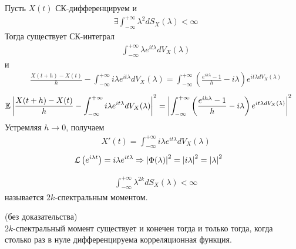\begin{example}
    Пусть $X(t)$ СК-дифференцируем и
    \begin{align*}
      & \exists \int_{-\infty}^{+\infty}\lambda^2dS_X(\lambda)< \infty
    \end{align*}
    Тогда существует СК-интеграл
    \begin{align*}
      & \int_{-\infty}^{+\infty}\lambda e^{it\lambda} dV_X(\lambda)
    \end{align*}
    и
    \begin{align*}
      & \frac{X(t+h) - X(t)}{h} - \int_{-\infty}^{+\infty}i\lambda e^{it\lambda} dV_X(\lambda) = \int_{-\infty}^{+\infty}\left( \frac{e^{ih\lambda}-1}{h}-i\lambda \right)e^{it\lambda dV_X(\lambda)}
    \end{align*}
     \begin{align*}
      & \mathbb{E}\left| \frac{X(t+h) - X(t)}{h} - \int_{-\infty}^{+\infty}i\lambda e^{it\lambda} dV_X(\lambda) \right|^2 = \left| \int_{-\infty}^{+\infty}\left( \frac{e^{ih\lambda}-1}{h}-i\lambda \right)e^{it\lambda dV_X(\lambda)} \right|^2
     \end{align*}
     Устремляя $h \to 0$, получаем
     \begin{align*}
      & X'(t) = \int_{-\infty}^{+\infty}i\lambda e^{it\lambda} dV_X(\lambda)
     \end{align*}
     \begin{align*}
       & \mathcal{L}\left( e^{i\lambda t} \right) = i\lambda e^{it\lambda} \Rightarrow \left| \Phi(\lambda) \right|^2 = \left| i\lambda \right|^2 = \left| \lambda \right|^2
    \end{align*}
\end{example}
\begin{Def}
    \begin{align*}
      & \int_{-\infty}^{+\infty}\lambda^{2k}dS_X(\lambda)< \infty
    \end{align*}
    называется $2k$-спектральным моментом.
\end{Def}
\begin{theorem} (без доказательства)
    \\
    $2k$-спектральный момент существует и конечен тогда и только тогда, когда
    столько раз в нуле дифференцируема корреляционная функция.
\end{theorem}